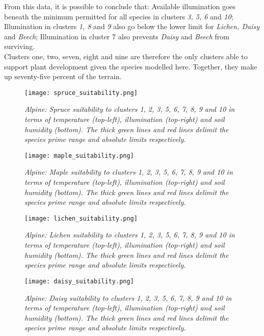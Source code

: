 From this data, it is possible to conclude that: Available illumination goes beneath the minimum permitted for all species in clusters \textit{3, 5, 6} and \textit{10}; Illumination in clusters \textit{1, 8} and \textit{9} also go below the lower limit for \textit{Lichen, Daisy} and \textit{Beech}; Illumination in cluster 7 also prevents \textit{Daisy} and \textit{Beech} from surviving. \\

Clusters one, two, seven, eight and nine are therefore the only clusters able to support plant development given the species modelled here. Together, they make up seventy-five percent of the terrain.\\

\begin{figure}
\center
	\texttt{[image: spruce\_suitability.png]}
	\caption{ \textit{Alpine: Spruce suitability to clusters 1, 2, 3, 5, 6, 7, 8, 9 and 10 in terms of temperature (top-left), illumination (top-right) and soil humidity (bottom). The thick green lines and red lines delimit the species prime range and absolute limits respectively.}}
	\label{fig:results_alpine_spruce_suitability}
\end{figure}

\begin{figure}
\center
	\texttt{[image: maple\_suitability.png]}
	\caption{ \textit{Alpine: Maple suitability to clusters 1, 2, 3, 5, 6, 7, 8, 9 and 10 in terms of temperature (top-left), illumination (top-right) and soil humidity (bottom). The thick green lines and red lines delimit the species prime range and absolute limits respectively.}}
	\label{fig:results_alpine_maple_suitability}
\end{figure}

\begin{figure}
\center
	\texttt{[image: lichen\_suitability.png]}
	\caption{ \textit{Alpine: Lichen suitability to clusters 1, 2, 3, 5, 6, 7, 8, 9 and 10 in terms of temperature (top-left), illumination (top-right) and soil humidity (bottom). The thick green lines and red lines delimit the species prime range and absolute limits respectively.}}
	\label{fig:results_alpine_lichen_suitability}
\end{figure}

\begin{figure}
\center
	\texttt{[image: daisy\_suitability.png]}
	\caption{ \textit{Alpine: Daisy suitability to clusters 1, 2, 3, 5, 6, 7, 8, 9 and 10 in terms of temperature (top-left), illumination (top-right) and soil humidity (bottom). The thick green lines and red lines delimit the species prime range and absolute limits respectively.}}
	\label{fig:results_alpine_daisy_suitability}
\end{figure}

